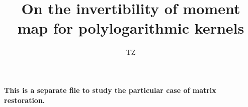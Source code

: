 \documentclass{article}
\title{On the invertibility of moment map for polylogarithmic kernels}
\author{TZ}
\begin{document}
\maketitle
\textbf{This is a separate file to study the particular case of matrix restoration.}

\end{document}
